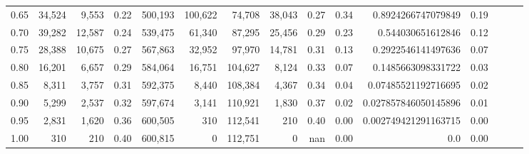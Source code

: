 \begin{tabular}{rrrrrrrrrrrrrrr}
0.65 &  34,524 &   9,553 &  0.22 &  500,193 &  100,622 &   74,708 &   38,043 &  0.27 &  0.34 &    0.8924266747079849 &      0.19 \\
0.70 &  39,282 &  12,587 &  0.24 &  539,475 &   61,340 &   87,295 &   25,456 &  0.29 &  0.23 &     0.544030651612846 &      0.12 \\
0.75 &  28,388 &  10,675 &  0.27 &  567,863 &   32,952 &   97,970 &   14,781 &  0.31 &  0.13 &    0.2922546141497636 &      0.07 \\
0.80 &  16,201 &   6,657 &  0.29 &  584,064 &   16,751 &  104,627 &    8,124 &  0.33 &  0.07 &    0.1485663098331722 &      0.03 \\
0.85 &   8,311 &   3,757 &  0.31 &  592,375 &    8,440 &  108,384 &    4,367 &  0.34 &  0.04 &   0.07485521192716695 &      0.02 \\
0.90 &   5,299 &   2,537 &  0.32 &  597,674 &    3,141 &  110,921 &    1,830 &  0.37 &  0.02 &  0.027857846050145896 &      0.01 \\
0.95 &   2,831 &   1,620 &  0.36 &  600,505 &      310 &  112,541 &      210 &  0.40 &  0.00 &  0.002749421291163715 &      0.00 \\
1.00 &     310 &     210 &  0.40 &  600,815 &        0 &  112,751 &        0 &   nan &  0.00 &                   0.0 &      0.00 \\
\bottomrule
\end{tabular}
